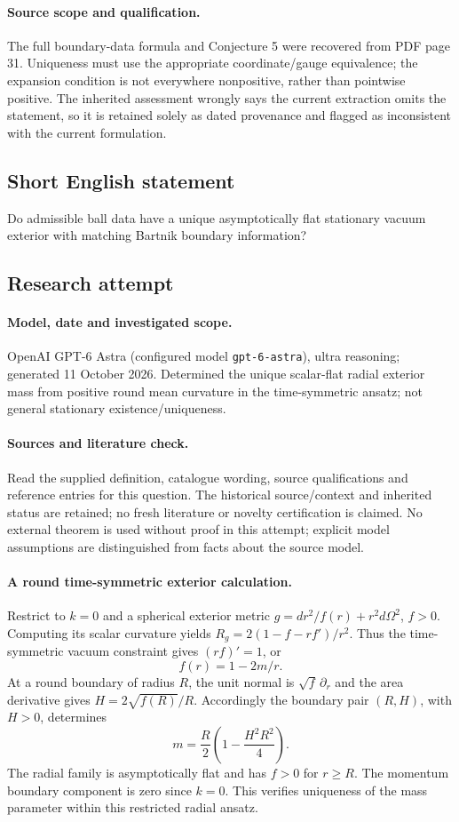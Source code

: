 \documentclass[11pt]{article}
\begin{document}
\paragraph{Source scope and qualification.}
The full boundary-data formula and Conjecture 5 were recovered from PDF page 31. Uniqueness must use the appropriate coordinate/gauge equivalence; the expansion condition is not everywhere nonpositive, rather than pointwise positive. The inherited assessment wrongly says the current extraction omits the statement, so it is retained solely as dated provenance and flagged as inconsistent with the current formulation.
\subsection{Short English statement}
Do admissible ball data have a unique asymptotically flat stationary vacuum exterior with matching Bartnik boundary information?
\subsection{Research attempt}
\paragraph{Model, date and investigated scope.}
OpenAI GPT-6 Astra (configured model \texttt{gpt-6-astra}), ultra reasoning; generated 11 October 2026. Determined the unique scalar-flat radial exterior mass from positive round mean curvature in the time-symmetric ansatz; not general stationary existence/uniqueness.

\paragraph{Sources and literature check.}
Read the supplied definition, catalogue wording, source qualifications and reference entries for this question. The historical source/context and inherited status are retained; no fresh literature or novelty certification is claimed. No external theorem is used without proof in this attempt; explicit model assumptions are distinguished from facts about the source model.

\paragraph{A round time-symmetric exterior calculation.} Restrict to \(k=0\) and a spherical exterior metric \(g=dr^2/f(r)+r^2d\Omega^2\), \(f>0\). Computing its scalar curvature yields \(R_g=2(1-f-rf')/r^2\). Thus the time-symmetric vacuum constraint gives \((rf)'=1\), or
\[
 f(r)=1-2m/r.
\]
At a round boundary of radius \(R\), the unit normal is \(\sqrt f\,\partial_r\) and the area derivative gives \(H=2\sqrt{f(R)}/R\). Accordingly the boundary pair \((R,H)\), with \(H>0\), determines
\[
 m=\frac R2\left(1-\frac{H^2R^2}{4}\right).
\]
The radial family is asymptotically flat and has \(f>0\) for \(r\ge R\). The momentum boundary component is zero since \(k=0\). This verifies uniqueness of the mass parameter within this restricted radial ansatz.
\end{document}
